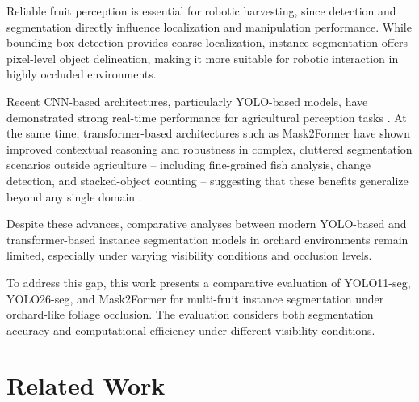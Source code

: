 \documentclass[runningheads]{llncs}
\begin{document}
Reliable fruit perception is essential for robotic harvesting, since detection
and segmentation directly influence localization and manipulation performance.
While bounding-box detection provides coarse localization, instance segmentation
offers pixel-level object delineation, making it more suitable for robotic
interaction in highly occluded environments.

Recent CNN-based architectures, particularly YOLO-based models, have demonstrated
strong real-time performance for agricultural perception tasks
\cite{10424305,10348779,11016889,11347840}. At the same time, transformer-based
architectures such as Mask2Former have shown improved contextual reasoning and
robustness in complex, cluttered segmentation scenarios outside agriculture
-- including fine-grained fish analysis, change detection, and stacked-object
counting -- suggesting that these benefits generalize beyond any single
domain \cite{10972542,10491166,11407412,11100168}.

Despite these advances, comparative analyses between modern YOLO-based and
transformer-based instance segmentation models in orchard environments remain
limited, especially under varying visibility conditions and occlusion levels.

To address this gap, this work presents a comparative evaluation of YOLO11-seg,
YOLO26-seg, and Mask2Former for multi-fruit instance segmentation under
orchard-like foliage occlusion. The evaluation considers both segmentation accuracy and
computational efficiency under different visibility conditions.





\section{Related Work}
\end{document}
